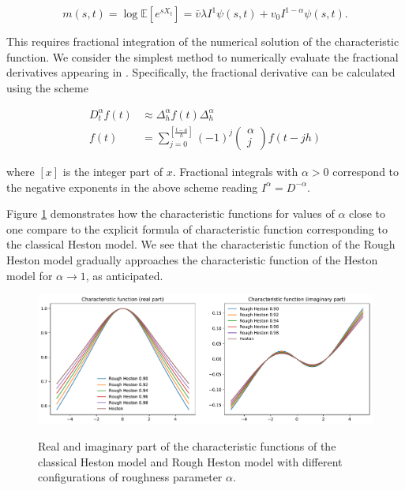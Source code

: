 \documentclass[12pt,twoside]{article}
\theoremstyle{plain}
\theoremstyle{plain}
\theoremstyle{definition}
\theoremstyle{remark}
\numberwithin{equation}{section}
\begin{document}
$$
m(s, t)=\log \mathbb{E}\left[e^{s X_{t}}\right]=\bar{v} \lambda I^{1} \psi(s, t)+v_{0} I^{1-\alpha} \psi(s, t).
$$

\vspace{5pt}

This requires fractional integration of the numerical solution of the characteristic function. We consider the simplest method to numerically evaluate the fractional derivatives appearing in \cite{P99}. Specifically, the fractional derivative can be calculated using the scheme

$$
\begin{aligned}
D_{t}^{\alpha} f(t) &\approx \Delta_{h}^{\alpha} f(t)
\Delta_{h}^{\alpha} \\[10pt] f(t)&=\sum_{j=0}^{\left[\frac{t-a}{h}\right]}(-1)^{j}\left(\begin{array}{c}\alpha \\ j\end{array}\right) f(t-j h)
\end{aligned}
$$

where $[x]$ is the integer part of $x$. Fractional integrals with $\alpha >0$ correspond to the negative exponents in the above scheme reading $I^\alpha = D^{-\alpha}$.

\newpage\clearpage

Figure \ref{fig: characteristic function comparison} demonstrates how the characteristic functions for values of $\alpha$ close to one compare to the explicit formula of characteristic function corresponding to the classical Heston model. We see that the characteristic function of the Rough Heston model gradually approaches the characteristic function of the Heston model for $\alpha\rightarrow 1$, as anticipated.

\begin{figure}[H]
\centering
\includegraphics[width=1\textwidth]{figures/cf.pdf} \\
\caption{Real and imaginary part of the characteristic functions of the classical Heston model and Rough Heston model with different configurations of roughness parameter $\alpha$.}
\label{fig: characteristic function comparison}
\end{figure}
\end{document}
